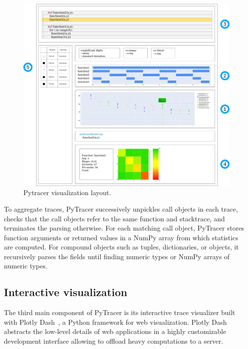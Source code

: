 \documentclass[11pt]{article}
\newcommand{\pytracer}[0]{PyTracer\xspace}
\begin{document}
\begin{figure}
    \centering
    \includegraphics[width=\textwidth]{figure/pytracer_layout.pdf}
    \caption{Pytracer visualization layout.}
    \label{fig:visu-layout}
\end{figure}


To aggregate traces, \pytracer successively unpickles call objects in each trace, checks
that the call objects refer to the same function and stacktrace, and terminates the parsing otherwise.
For each matching call object, \pytracer stores function arguments or returned values in a NumPy array from which statistics are computed. 
For compound objects such as tuples, dictionaries, or objects, it recursively parses the fields until finding
numeric types or NumPy arrays of numeric types.

\subsection{Interactive visualization}

The third main component of \pytracer is its interactive trace visualizer built with Plotly Dash~\cite{plotly}, a Python framework for web visualization.
Plotly Dash abstracts the low-level details of web applications in a highly customizable development interface allowing to offload heavy computations to a server. 
\end{document}
